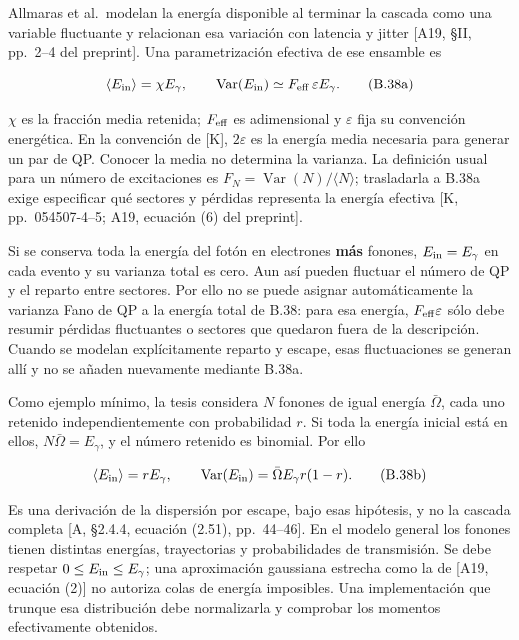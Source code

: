 \documentclass[
  spanish,
  10pt,
  a4paper,
]{article}
\newcounter{none} %
\begin{document}
Allmaras et al.~modelan la energía disponible al terminar la cascada
como una variable fluctuante y relacionan esa variación con latencia y
jitter {[}A19, §II, pp.~2--4 del preprint{]}. Una parametrización
efectiva de ese ensamble es

\[
\langle E_{\rm in}\rangle=\chi E_\gamma,
\qquad
\operatorname{Var}(E_{\rm in})\simeq F_{\rm eff}\,\varepsilon E_\gamma.
\tag{B.38a}
\]

\(\chi\) es la fracción media retenida; \(F_{\rm eff}\) es adimensional
y \(\varepsilon\) fija su convención energética. En la convención de
{[}K{]}, \(2\varepsilon\) es la energía media necesaria para generar un
par de QP. Conocer la media no determina la varianza. La definición
usual para un número de excitaciones es
\(F_N=\operatorname{Var}(N)/\langle N\rangle\); trasladarla a B.38a
exige especificar qué sectores y pérdidas representa la energía efectiva
{[}K, pp.~054507-4--5; A19, ecuación (6) del preprint{]}.

Si se conserva toda la energía del fotón en electrones \textbf{más}
fonones, \(E_{\rm in}=E_\gamma\) en cada evento y su varianza total es
cero. Aun así pueden fluctuar el número de QP y el reparto entre
sectores. Por ello no se puede asignar automáticamente la varianza Fano
de QP a la energía total de B.38: para esa energía,
\(F_{\rm eff}\varepsilon\) sólo debe resumir pérdidas fluctuantes o
sectores que quedaron fuera de la descripción. Cuando se modelan
explícitamente reparto y escape, esas fluctuaciones se generan allí y no
se añaden nuevamente mediante B.38a.

Como ejemplo mínimo, la tesis considera \(N\) fonones de igual energía
\(\bar\Omega\), cada uno retenido independientemente con probabilidad
\(r\). Si toda la energía inicial está en ellos,
\(N\bar\Omega=E_\gamma\), y el número retenido es binomial. Por ello

\[
\langle E_{\rm in}\rangle=rE_\gamma,
\qquad
\operatorname{Var}(E_{\rm in})
=\bar\Omega E_\gamma r(1-r).
\tag{B.38b}
\]

Es una derivación de la dispersión por escape, bajo esas hipótesis, y no
la cascada completa {[}A, §2.4.4, ecuación (2.51), pp.~44--46{]}. En el
modelo general los fonones tienen distintas energías, trayectorias y
probabilidades de transmisión. Se debe respetar
\(0\leq E_{\rm in}\leq E_\gamma\); una aproximación gaussiana estrecha
como la de {[}A19, ecuación (2){]} no autoriza colas de energía
imposibles. Una implementación que trunque esa distribución debe
normalizarla y comprobar los momentos efectivamente obtenidos.
\end{document}
